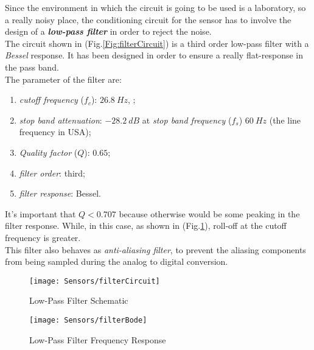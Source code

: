Since the environment in which the circuit is going to be used is a laboratory, so a really noisy place, the conditioning circuit for the sensor has to involve the design of a \textit{\textbf{low-pass filter}} in order to reject the noise.\\

The circuit shown in (Fig.\ref{Fig:filterCircuit}) is a third order low-pass filter with a \textit{Bessel} response. It has been designed in order to ensure a really flat-response in the pass band. \\
The parameter of the filter are:

\begin{enumerate}
	\item \textit{cutoff frequency} ($f_c$): $26.8\ Hz$, ;
\item \textit{stop band attenuation}: $-28.2\ dB$ at \textit{stop band frequency} ($f_s$) $60\ Hz$ (the line frequency in USA);
\item \textit{Quality factor} ($Q$): $0.65$;
\item \textit{filter order}: third;
\item \textit{filter response}: Bessel.
\end{enumerate}

It's important that $Q < 0.707$ because otherwise would be some peaking in the filter response. While, in this case, as shown in (Fig.\ref{Fig:filterbode}), roll-off at the cutoff frequency is greater.\\
This filter also behaves as \textit{anti-aliasing filter}, to prevent the aliasing components from being sampled during the analog to digital conversion.\\



\newpage
\clearpage

\begin{figure}[h]
	\begin{center}
	\texttt{[image: Sensors/filterCircuit]}
	\caption{Low-Pass Filter Schematic}
	\label{Fig:filterCircuit}

	\centering
	\texttt{[image: Sensors/filterBode]}
	\caption{Low-Pass Filter Frequency Response}
	\label{Fig:filterbode}
	\end{center}
\end{figure}
	
